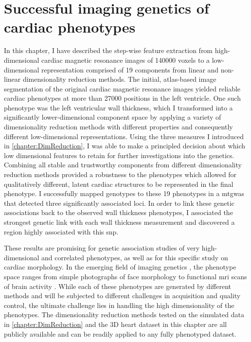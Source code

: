 \newpage
\section{Successful imaging genetics of cardiac phenotypes}
In this chapter, I have described the step-wise feature extraction from high-dimensional cardiac magnetic resonance images of \num{140000} voxels to a low-dimensional  representation comprised of \num{19} components from linear and non-linear dimensionality reduction methods. The initial, atlas-based image segmentation of the original cardiac magnetic resonance images yielded reliable cardiac phenotypes at more than \num{27000} positions in the left ventricle. One such phenotype was the left ventricular wall thickness, which I transformed into a significantly lower-dimensional component space by applying a variety of dimensionality reduction methods with different properties and consequently different low-dimensional representations. Using the three measures I introduced in \cref{chapter:DimReduction}, I was able to make a principled decision about which low dimensional features to retain for further investigations into the genetics. Combining all stable and trustworthy components from different dimensionality reduction methods provided a robustness to the phenotypes which allowed for qualitatively different, latent cardiac structures to be represented in the final phenotype. I successfully mapped genotypes to these \num{19} phenotypes in a \gls{mtgwas} that detected three significantly associated loci. In order to link these genetic associations back to the observed wall thickness phenotypes, I associated the strongest genetic link with each wall thickness measurement and discovered a region highly associated with this \gls{snp}.  

These results are promising for genetic association studies of very high-dimensional and correlated phenotypes, as well as for this specific study on cardiac morphology. In the emerging field of imaging genetics \citep{Ge2014}, the phenotype space ranges from simple photographs of face morphology \citep{Liu2012,Shaffer2016} to functional \gls{mri} scans of brain activity  \citep{Stein2010,Hibar2015}. While each of these phenotypes are generated by different methods and will be subjected to different challenges in acquisition and quality control, the ultimate challenge lies in handling the high dimensionality of the phenotypes. The dimensionality reduction methods tested on the simulated data in \cref{chapter:DimReduction} and the 3D heart dataset in this chapter are all publicly available and can be readily applied to any fully phenotyped dataset. 

